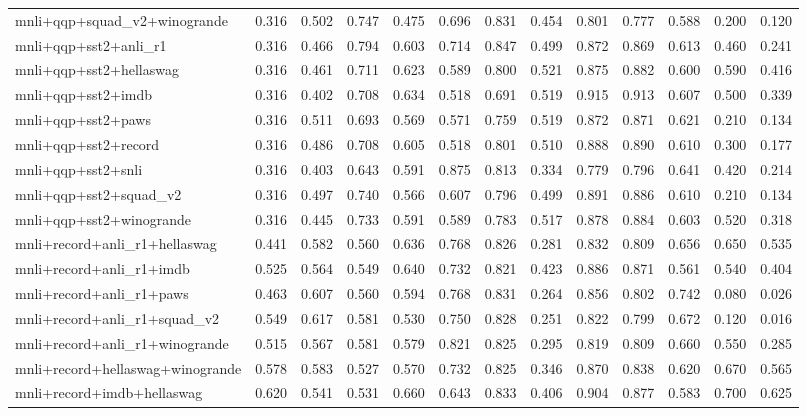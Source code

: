 \begin{table}[t]
\begin{tabular}{lrrrrrrrrrrrr}
    mnli+qqp+squad\_v2+winogrande & 0.316 & 0.502 & 0.747 & 0.475 & 0.696 & 0.831 & 0.454 & 0.801 & 0.777 & 0.588 & 0.200 & 0.120 \\
    mnli+qqp+sst2+anli\_r1 & 0.316 & 0.466 & 0.794 & 0.603 & 0.714 & 0.847 & 0.499 & 0.872 & 0.869 & 0.613 & 0.460 & 0.241 \\
    mnli+qqp+sst2+hellaswag & 0.316 & 0.461 & 0.711 & 0.623 & 0.589 & 0.800 & 0.521 & 0.875 & 0.882 & 0.600 & 0.590 & 0.416 \\
    mnli+qqp+sst2+imdb & 0.316 & 0.402 & 0.708 & 0.634 & 0.518 & 0.691 & 0.519 & 0.915 & 0.913 & 0.607 & 0.500 & 0.339 \\
    mnli+qqp+sst2+paws & 0.316 & 0.511 & 0.693 & 0.569 & 0.571 & 0.759 & 0.519 & 0.872 & 0.871 & 0.621 & 0.210 & 0.134 \\
    mnli+qqp+sst2+record & 0.316 & 0.486 & 0.708 & 0.605 & 0.518 & 0.801 & 0.510 & 0.888 & 0.890 & 0.610 & 0.300 & 0.177 \\
    mnli+qqp+sst2+snli & 0.316 & 0.403 & 0.643 & 0.591 & 0.875 & 0.813 & 0.334 & 0.779 & 0.796 & 0.641 & 0.420 & 0.214 \\
    mnli+qqp+sst2+squad\_v2 & 0.316 & 0.497 & 0.740 & 0.566 & 0.607 & 0.796 & 0.499 & 0.891 & 0.886 & 0.610 & 0.210 & 0.134 \\
    mnli+qqp+sst2+winogrande & 0.316 & 0.445 & 0.733 & 0.591 & 0.589 & 0.783 & 0.517 & 0.878 & 0.884 & 0.603 & 0.520 & 0.318 \\
    mnli+record+anli\_r1+hellaswag & 0.441 & 0.582 & 0.560 & 0.636 & 0.768 & 0.826 & 0.281 & 0.832 & 0.809 & 0.656 & 0.650 & 0.535 \\
    mnli+record+anli\_r1+imdb & 0.525 & 0.564 & 0.549 & 0.640 & 0.732 & 0.821 & 0.423 & 0.886 & 0.871 & 0.561 & 0.540 & 0.404 \\
    mnli+record+anli\_r1+paws & 0.463 & 0.607 & 0.560 & 0.594 & 0.768 & 0.831 & 0.264 & 0.856 & 0.802 & 0.742 & 0.080 & 0.026 \\
    mnli+record+anli\_r1+squad\_v2 & 0.549 & 0.617 & 0.581 & 0.530 & 0.750 & 0.828 & 0.251 & 0.822 & 0.799 & 0.672 & 0.120 & 0.016 \\
    mnli+record+anli\_r1+winogrande & 0.515 & 0.567 & 0.581 & 0.579 & 0.821 & 0.825 & 0.295 & 0.819 & 0.809 & 0.660 & 0.550 & 0.285 \\
    mnli+record+hellaswag+winogrande & 0.578 & 0.583 & 0.527 & 0.570 & 0.732 & 0.825 & 0.346 & 0.870 & 0.838 & 0.620 & 0.670 & 0.565 \\
    mnli+record+imdb+hellaswag & 0.620 & 0.541 & 0.531 & 0.660 & 0.643 & 0.833 & 0.406 & 0.904 & 0.877 & 0.583 & 0.700 & 0.625 \\

\end{tabular}
\end{table}
